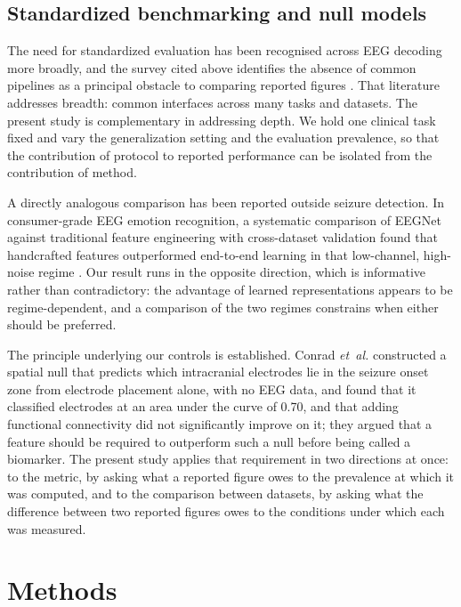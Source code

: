 \documentclass[11pt,a4paper]{article}
\newcommand{\etal}{\textit{et~al.}}
\begin{document}
\subsection{Standardized benchmarking and null models}

The need for standardized evaluation has been recognised across EEG
decoding more broadly, and the survey cited above identifies the absence of
common pipelines as a principal obstacle to comparing reported figures
\citep{crosssubjsurvey2026}. That literature addresses breadth: common
interfaces across many tasks and datasets. The present study is
complementary in addressing depth. We hold one clinical task fixed and vary
the generalization setting and the evaluation prevalence, so that the
contribution of protocol to reported performance can be isolated from the
contribution of method.

A directly analogous comparison has been reported outside seizure detection.
In consumer-grade EEG emotion recognition, a systematic comparison of EEGNet
against traditional feature engineering with cross-dataset validation found
that handcrafted features outperformed end-to-end learning in that
low-channel, high-noise regime \citep{consumereeg2026}. Our result runs in the
opposite direction, which is informative rather than contradictory: the
advantage of learned representations appears to be regime-dependent, and a
comparison of the two regimes constrains when either should be preferred.

The principle underlying our controls is established. Conrad \etal
\citep{conrad2022} constructed a spatial null that predicts which intracranial
electrodes lie in the seizure onset zone from electrode placement alone, with
no EEG data, and found that it classified electrodes at an area under the
curve of 0.70, and that adding functional connectivity did not significantly
improve on it; they argued that a feature should be required to outperform
such a null before being called a biomarker. The present study applies that
requirement in two directions at once: to the metric, by asking what a
reported figure owes to the prevalence at which it was computed, and to the
comparison between datasets, by asking what the difference between two
reported figures owes to the conditions under which each was measured.

\section{Methods}
\end{document}
